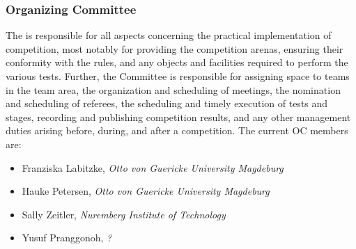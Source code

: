 \subsubsection{Organizing Committee}
The  is responsible for all aspects concerning the practical implementation of competition, most notably for providing the competition arenas, ensuring their conformity with the rules, and any objects and facilities required to perform the various tests. Further, the Committee is responsible for assigning space to teams in the team area, the organization and scheduling of meetings, the nomination and scheduling of referees, the scheduling and timely execution of tests and stages, recording and publishing competition results, and any other management duties arising before, during, and after a competition. The current OC members are:

\begin{itemize}
    \item Franziska Labitzke, \textit{Otto von Guericke University Magdeburg}
    \item Hauke Petersen, \textit{Otto von Guericke University Magdeburg} 
    \item Sally Zeitler, \textit{Nuremberg Institute of Technology}
    \item Yusuf Pranggonoh, \textit{?}
\end{itemize}






